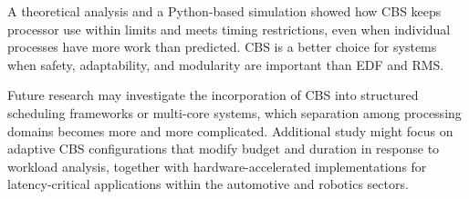 \documentclass[conference]{IEEEtran}
\begin{document}
 A theoretical analysis and a Python-based simulation showed how CBS keeps processor use within limits and meets timing restrictions, even when individual processes have more work than predicted.  CBS is a better choice for systems when safety, adaptability, and modularity are important than EDF and RMS.

 Future research may investigate the incorporation of CBS into structured scheduling frameworks or multi-core systems, which separation among processing domains becomes more and more complicated.  Additional study might focus on adaptive CBS configurations that modify budget and duration in response to workload analysis, together with hardware-accelerated implementations for latency-critical applications within the automotive and robotics sectors.






\end{document}
